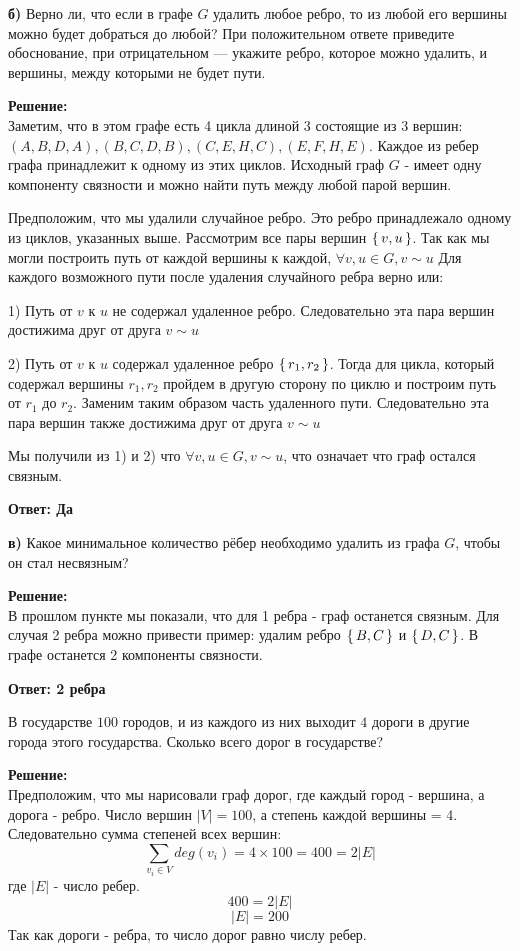 \documentclass[a4paper,12pt]{article}
\newcounter{z}
\newcommand{\z}{\refstepcounter{z}\vskip 20pt\noindent
\fbox{\textbf{\arabic{z}}} }
\begin{document}
{\bf б)} Верно ли, что если в графе $G$ удалить любое ребро, то из любой его
вершины можно будет добраться до любой? При положительном ответе
приведите обоснование, при отрицательном --- укажите ребро, которое
можно удалить, и вершины, между которыми не будет пути.

\textbf{Решение:} \\
Заметим, что в этом графе есть 4 цикла длиной 3 состоящие из 3 вершин: \\ $(A,B,D, A), (B,C,D, B), (C,E,H, C), (E,F,H, E)$. Каждое из ребер графа принадлежит к одному из этих циклов. Исходный граф $G$ - имеет одну компоненту связности и можно найти путь между любой парой вершин.

Предположим, что мы удалили случайное ребро. Это ребро принадлежало одному из циклов, указанных выше.
Рассмотрим все пары вершин $\set{v, u}$. Так как мы могли построить путь от каждой вершины к каждой, $\forall v,u \in G, v \sim u$
Для каждого возможного пути после удаления случайного ребра верно или:

1) Путь от $v$ к $u$ не содержал удаленное ребро. Следовательно эта пара вершин достижима друг от друга $v \sim u$

2) Путь от $v$ к $u$ содержал удаленное ребро $\set{r_1, r_2}$. Тогда для цикла, который содержал вершины $r_1, r_2$ пройдем в другую сторону по циклю и построим путь от $r_1$ до $r_2$. Заменим таким образом часть удаленного пути. Следовательно эта пара вершин также достижима друг от друга $v \sim u$

Мы получили из 1) и 2) что $\forall v,u \in G, v \sim u$, что означает что граф остался связным.

\textbf{Ответ: Да}

{\bf в)} Какое минимальное количество рёбер необходимо удалить из графа $G$, чтобы он стал несвязным?

\textbf{Решение:} \\
В прошлом пункте мы показали, что для 1 ребра - граф останется связным. Для случая 2 ребра можно привести пример: удалим ребро $\set{B, C}$ и $\set{D, C}$. В графе останется 2 компоненты связности.

\textbf{Ответ: 2 ребра}

\z В государстве $100$ городов, и из каждого из них выходит $4$ дороги в другие города этого государства. Сколько всего дорог в государстве?

\textbf{Решение:} \\
Предположим, что мы нарисовали граф дорог, где каждый город - вершина, а дорога - ребро. Число вершин $|V| = 100$, а степень каждой вершины = 4.
Следовательно сумма степеней всех вершин:
$$\sum_{v_i \in V}{deg(v_i)} = 4\times100 = 400 = 2|E|$$
где $|E|$ - число ребер.
$$400 = 2|E|$$
$$|E| = 200$$
Так как дороги - ребра, то число дорог равно числу ребер.
\end{document}

